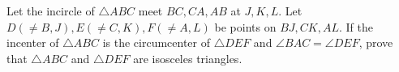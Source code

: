 Let the incircle of $\triangle ABC$ meet $BC,CA,AB$ at $J,K,L$. Let $D(\ne B, J),E(\ne C,K), F(\ne A,L)$ be points on
$BJ,CK,AL$. If the incenter of $\triangle ABC$ is the circumcenter of $\triangle DEF$ and $\angle BAC = \angle DEF$, prove that $\triangle ABC$ and $\triangle DEF$ are isosceles triangles.